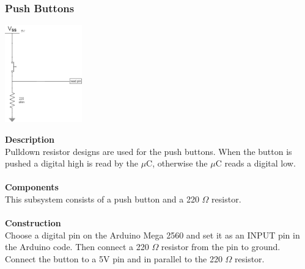 \documentclass[titlepage]{article}
\begin{document}
\subsubsection{Push Buttons}
\begin{center}
	\includegraphics[width = 0.25\textwidth]{PushButton.png}
\label{fig:PushButtonFig}
\end{center}
\textbf{Description}\\
Pulldown resistor designs are used for the push buttons. When the button is pushed a digital high is read by the $\mu$C, otherwise the $\mu$C reads a digital low.\\\\
\textbf{Components}\\
This subsystem consists of a push button and a 220 $\Omega$ resistor.\\\\
\textbf{Construction}\\
Choose a digital pin on the Arduino Mega 2560 and set it as an INPUT pin in the Arduino code. Then connect a 220 $\Omega$ resistor from the pin to ground. Connect the button to a 5V pin and in parallel to the 220 $\Omega$ resistor.
\end{document}
